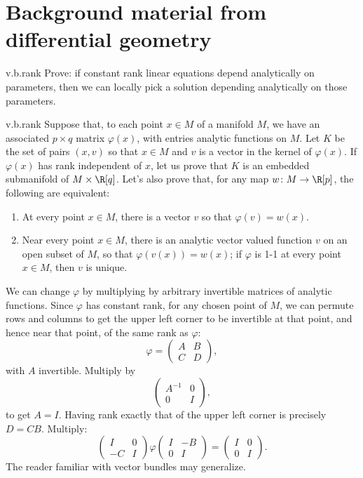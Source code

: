 \section{Background material from differential geometry}
\begin{problem}{v.b.rank}
Prove: if constant rank linear equations depend analytically on parameters, then we can locally pick a solution depending analytically on those parameters.
\end{problem}
\begin{answer}{v.b.rank}
Suppose that, to each point \(x\in M\) of a manifold \(M\), we have an associated \(p \times q\) matrix \(\varphi(x)\), with entries analytic functions on \(M\).
Let \(K\) be the set of pairs \((x,v)\) so that \(x \in M\) and \(v\) is a vector in the kernel of \(\varphi(x)\).
If \(\varphi(x)\) has rank independent of \(x\), let us prove that \(K\) is an embedded submanifold of \(M \times \R[q]\).
Let's also prove that, for any map \(w\colon M \to \R[p]\), the following are equivalent:
\begin{enumerate}
\item At every point \(x \in M\), there is a vector \(v\) so that \(\varphi(v)=w(x)\).
\item Near every point \(x \in M\), there is an analytic vector valued function \(v\) on an open subset of \(M\), so that \(\varphi(v(x))=w(x)\); if \(\varphi\) is 1-1 at every point \(x \in M\), then \(v\) is unique.
\end{enumerate} 
We can change \(\varphi\) by multiplying by arbitrary invertible matrices of analytic functions.
Since \(\varphi\) has constant rank, for any chosen point of \(M\), we can permute rows and columns to get the upper left corner to be invertible at that point, and hence near that point, of the same rank as \(\varphi\):
\[
\varphi=
\begin{pmatrix}
A&B\\
C&D
\end{pmatrix},
\]
with \(A\) invertible.
Multiply by 
\[
\begin{pmatrix}
A^{-1}&0\\
0&I
\end{pmatrix},
\]
to get \(A=I\).
Having rank exactly that of the upper left corner is precisely \(D=CB\).
Multiply:
\[
\begin{pmatrix}
I&0\\
-C&I
\end{pmatrix}
\varphi
\begin{pmatrix}
I&-B\\
0&I
\end{pmatrix}=
\begin{pmatrix}
I&0\\
0&I
\end{pmatrix}.
\]
The reader familiar with vector bundles  \cite{Chern:1989} may generalize.
\end{answer}
